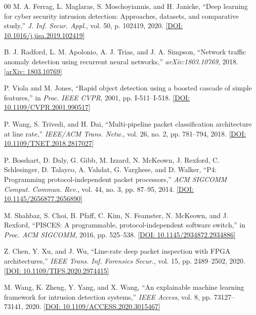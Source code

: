 \documentclass[conference]{IEEEtran}
\begin{document}
\begin{thebibliography}{00}
M. A. Ferrag, L. Maglaras, S. Moschoyiannis, and H. Janicke, ``Deep learning for cyber security intrusion detection: Approaches, datasets, and comparative study,'' \textit{J. Inf. Secur. Appl.}, vol. 50, p. 102419, 2020. \href{https://doi.org/10.1016/j.jisa.2019.102419}{[DOI: 10.1016/j.jisa.2019.102419]}

B. J. Radford, L. M. Apolonio, A. J. Trias, and J. A. Simpson, ``Network traffic anomaly detection using recurrent neural networks,'' \textit{arXiv:1803.10769}, 2018. \href{https://arxiv.org/abs/1803.10769}{[arXiv: 1803.10769]}

P. Viola and M. Jones, ``Rapid object detection using a boosted cascade of simple features,'' in \textit{Proc. IEEE CVPR}, 2001, pp. I-511--I-518. \href{https://doi.org/10.1109/CVPR.2001.990517}{[DOI: 10.1109/CVPR.2001.990517]}

P. Wang, S. Trivedi, and H. Dai, ``Multi-pipeline packet classification architecture at line rate,'' \textit{IEEE/ACM Trans. Netw.}, vol. 26, no. 2, pp. 781--794, 2018. \href{https://doi.org/10.1109/TNET.2018.2817027}{[DOI: 10.1109/TNET.2018.2817027]}

P. Bosshart, D. Daly, G. Gibb, M. Izzard, N. McKeown, J. Rexford, C. Schlesinger, D. Talayco, A. Vahdat, G. Varghese, and D. Walker, ``P4: Programming protocol-independent packet processors,'' \textit{ACM SIGCOMM Comput. Commun. Rev.}, vol. 44, no. 3, pp. 87--95, 2014. \href{https://doi.org/10.1145/2656877.2656890}{[DOI: 10.1145/2656877.2656890]}

M. Shahbaz, S. Choi, B. Pfaff, C. Kim, N. Feamster, N. McKeown, and J. Rexford, ``PISCES: A programmable, protocol-independent software switch,'' in \textit{Proc. ACM SIGCOMM}, 2016, pp. 525--538. \href{https://doi.org/10.1145/2934872.2934886}{[DOI: 10.1145/2934872.2934886]}

Z. Chen, Y. Xu, and J. Wu, ``Line-rate deep packet inspection with FPGA architectures,'' \textit{IEEE Trans. Inf. Forensics Secur.}, vol. 15, pp. 2489--2502, 2020. \href{https://doi.org/10.1109/TIFS.2020.2974415}{[DOI: 10.1109/TIFS.2020.2974415]}

M. Wang, K. Zheng, Y. Yang, and X. Wang, ``An explainable machine learning framework for intrusion detection systems,'' \textit{IEEE Access}, vol. 8, pp. 73127--73141, 2020. \href{https://doi.org/10.1109/ACCESS.2020.3015467}{[DOI: 10.1109/ACCESS.2020.3015467]}


\end{thebibliography}
\end{document}
